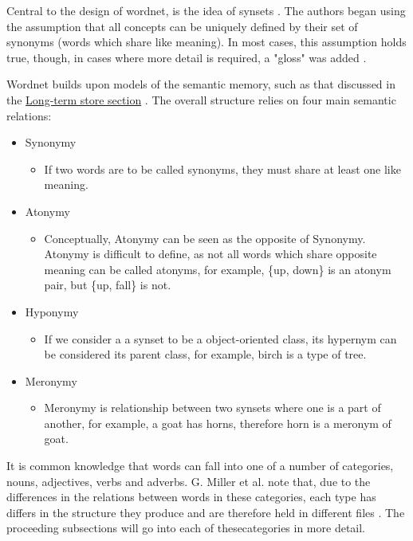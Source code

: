 \documentclass[]{article}
\begin{document}
\label{Synsets}Central to the design of wordnet, is the idea of synsets \cite{WN1Introduction}. The authors began using the assumption that all concepts can be uniquely defined by their set of synonyms (words which share like meaning). In most cases, this assumption holds true, though, in cases where more detail is required, a "gloss" was added \cite{WN1Introduction}.

Wordnet builds upon models of the semantic memory, such as that discussed in the \hyperref[LongTerm]{Long-term store section} \cite{WN1Introduction}. The overall structure relies on four main semantic relations:

\begin{itemize}
	\item Synonymy
	\begin{itemize}
		\item If two words are to be called synonyms, they must share at least one like meaning.
	\end{itemize}
	
	\item Atonymy \label{Atonym}
	\begin{itemize}
		\item Conceptually, Atonymy can be seen as the opposite of Synonymy. Atonymy is difficult to define, as not all words which share opposite meaning can be called atonyms, for example, \{up, down\} is an atonym pair, but \{up, fall\} is not.
	\end{itemize}
	
	\item Hyponymy \label{Hypernym}
	\begin{itemize}
		\item If we consider a a synset to be a object-oriented class, its hypernym can be considered its parent class, for example, birch is a type of tree.
	\end{itemize}
	
	\item Meronymy \label{Meronym}
	\begin{itemize}
		\item Meronymy is relationship between two synsets where one is a part of another, for example, a goat has horns, therefore horn is a meronym of goat.
	\end{itemize}
	
\end{itemize}

It is common knowledge that words can fall into one of a number of categories, nouns, adjectives, verbs and adverbs. G. Miller et al. note that, due to the differences in the relations between words in these categories, each type has differs in the structure they produce and are therefore held in different files \cite{WN1Introduction}. The proceeding subsections will go into each of thesecategories in more detail.
\end{document}
